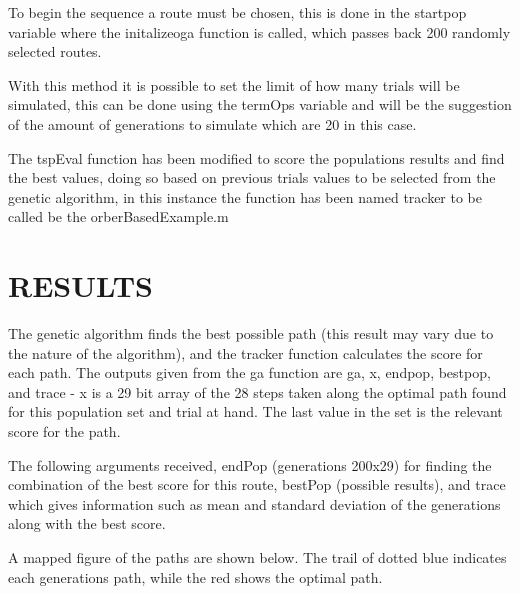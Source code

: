\documentclass[a4paper, 10pt]{IEEEconf}
\begin{document}
To begin the sequence a route must be chosen, this is done in the startpop variable where the initalizeoga function is called, which passes back 200 randomly selected routes.

With this method it is possible to set the limit of how many trials will be simulated, this can be done using the termOps variable and will be the suggestion of the amount of generations to simulate which are 20 in this case.

The tspEval function has been modified to score the populations results and find the best values, doing so based on previous trials values to be selected from the genetic algorithm, in this instance the function has been named tracker to be called be the orberBasedExample.m

\section{RESULTS}

The genetic algorithm finds the best possible path (this result may vary due to the nature of the algorithm), and the tracker function calculates the score for each path. The outputs given from the ga function are ga, x, endpop, bestpop, and trace - x is a 29 bit array of the 28 steps taken along the optimal path found for this population set and trial at hand. The last value in the set is the relevant score for the path.

The following arguments received, endPop (generations 200x29) for finding the combination of the best score for this route, bestPop (possible results), and trace which gives information such as mean and standard deviation of the generations along with the best score. 


A mapped figure of the paths are shown below. The trail of dotted blue indicates each generations path, while the red shows the optimal path.

\end{document}
